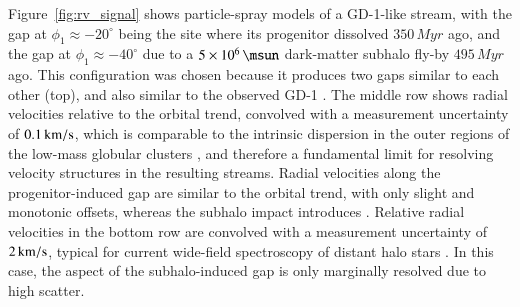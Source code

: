 \documentclass[final,5p,times,twocolumn,authoryear]{elsarticle}
\begin{document}
Figure~\ref{fig:rv_signal} shows particle-spray models of a GD-1-like stream, with the gap at $\phi_1\approx-20^\circ$ being the site where its progenitor dissolved $350\,\unit{Myr}$ ago, and the gap at $\phi_1\approx-40^\circ$ due to a $5\times10^6\,\unit{\msun}$ dark-matter subhalo fly-by $495\,\unit{Myr}$ ago.
This configuration was chosen because it produces two gaps similar to each other  (top), and also similar to the observed GD-1  \citep[e.g.,][]{price-whelan:2018}.
The middle row shows radial velocities relative to the orbital trend, convolved with a measurement uncertainty of $0.1\,\unit{\kms}$, which is comparable to the intrinsic dispersion in the outer regions of the low-mass globular clusters \citep[]{baumgardt:2019}, and therefore a fundamental limit for resolving velocity structures in the resulting streams.
Radial velocities along the progenitor-induced gap are similar to the orbital trend, with only slight and monotonic offsets, whereas the subhalo impact introduces .
Relative radial velocities in the bottom row are convolved with a measurement uncertainty of $2\,\unit{\kms}$, typical for current wide-field spectroscopy of distant halo stars \citep[e.g.,][]{li:2019, cooper:2023}.
In this case, the  aspect of the subhalo-induced gap is only marginally resolved due to high scatter.
\end{document}
